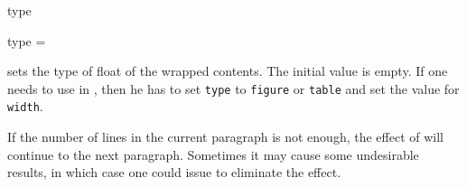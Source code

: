 \documentclass{l3doc}
\newcommand{\opt}[1]{\texttt{#1}}
\begin{document}
\begin{function}{type}
  \begin{syntax}
    type = 
  \end{syntax}
  sets the type of float of the wrapped contents.
  The initial value is empty.
  If one needs to use  in ,
  then he has to set \opt{type} to \opt{figure} or \opt{table}
  and set the value for \opt{width}.
\end{function}

\begin{function}{\wrapstuffclear}
  If the number of lines in the current paragraph is not enough,
  the effect of  will continue to the next paragraph.
  Sometimes it may cause some undesirable results,
  in which case one could issue  to eliminate
  the effect.
\end{function}
\end{document}
